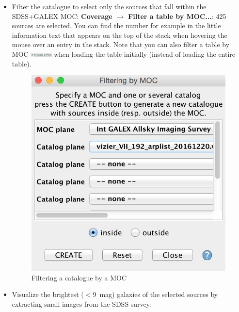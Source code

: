 \documentclass [a4paper, 12pt]{article}
\begin{document}
\begin{itemize}
    \item Filter the catalogue to select only the sources that fall within 
the SDSS+GALEX MOC: \textbf{Coverage $\rightarrow$ Filter a table by 
MOC...}: 425 sources are selected. You can find the number for example in the 
little information text that appears on the top of the stack when hovering the 
mouse over an entry in the stack. Note that you can also filter a table by MOC 
\includegraphics[width=0.09\textwidth]{../images/aladin_load_byMOC.png}
when loading the table initially (instead of loading the entire table). 
\begin{figure}[H]
\center
\includegraphics[width=0.4 
\textwidth]{../images/aladin_moc_filter-tab-by-moc.jpg}
\caption{Filtering a catalogue by a MOC}
\label{fig:filtermoc}
\end{figure}

    \item Visualize the brightest ($<$9~mag) galaxies of the selected 
sources by extracting small images from the SDSS survey:


\end{itemize}
\end{document}
